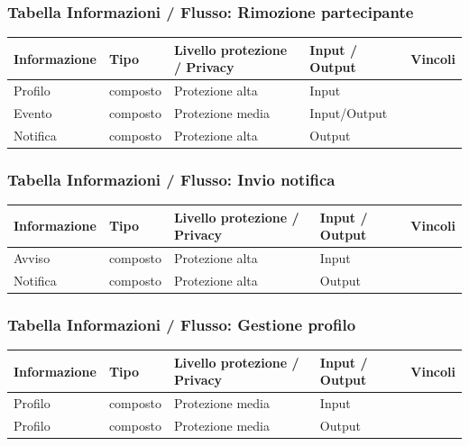 \documentclass[12pt,a4paper]{report}
\begin{document}
\subsubsection{Tabella Informazioni / Flusso: Rimozione partecipante}
\begin{tabularx}{\textwidth}{|X|X|X|X|X|}
    \hline
    \rowcolor{studyColor} \textbf{Informazione} & \textbf{Tipo} & \textbf{Livello protezione / Privacy} & \textbf{Input / Output} & \textbf{Vincoli} \\ \hline
    \endhead
    Profilo & composto & Protezione alta & Input & \\ \hline
    Evento & composto & Protezione media & Input/Output & \\ \hline
    Notifica & composto & Protezione alta & Output & \\ \hline
\end{tabularx}

\subsubsection{Tabella Informazioni / Flusso: Invio notifica}
\begin{tabularx}{\textwidth}{|X|X|X|X|X|}
    \hline
    \rowcolor{studyColor} \textbf{Informazione} & \textbf{Tipo} & \textbf{Livello protezione / Privacy} & \textbf{Input / Output} & \textbf{Vincoli} \\ \hline
    \endhead
    Avviso & composto & Protezione alta & Input & \\ \hline
    Notifica & composto & Protezione alta & Output & \\ \hline
\end{tabularx}

\subsubsection{Tabella Informazioni / Flusso: Gestione profilo}
\begin{tabularx}{\textwidth}{|X|X|X|X|X|}
    \hline
    \rowcolor{studyColor} \textbf{Informazione} & \textbf{Tipo} & \textbf{Livello protezione / Privacy} & \textbf{Input / Output} & \textbf{Vincoli} \\ \hline
    \endhead
    Profilo & composto & Protezione media & Input & \\ \hline
    Profilo & composto & Protezione media & Output & \\ \hline
\end{tabularx}
\end{document}
